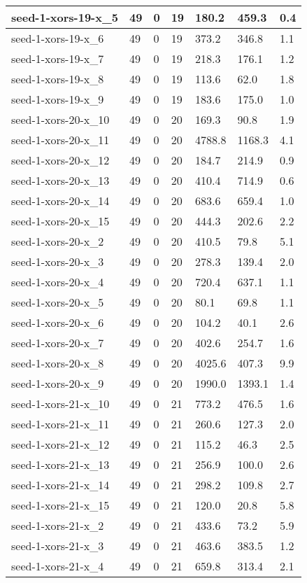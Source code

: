 \begin{scriptsize}
\begin{longtable}{|p{5cm}|l|l|l|l|l|l|}
seed-1-xors-19-x\_5&49&0&19&180.2&459.3&0.4 \\ \hline 
seed-1-xors-19-x\_6&49&0&19&373.2&346.8&1.1 \\ \hline 
seed-1-xors-19-x\_7&49&0&19&218.3&176.1&1.2 \\ \hline 
seed-1-xors-19-x\_8&49&0&19&113.6&62.0&1.8 \\ \hline 
seed-1-xors-19-x\_9&49&0&19&183.6&175.0&1.0 \\ \hline 
seed-1-xors-20-x\_10&49&0&20&169.3&90.8&1.9 \\ \hline 
seed-1-xors-20-x\_11&49&0&20&4788.8&1168.3&4.1 \\ \hline 
seed-1-xors-20-x\_12&49&0&20&184.7&214.9&0.9 \\ \hline 
seed-1-xors-20-x\_13&49&0&20&410.4&714.9&0.6 \\ \hline 
seed-1-xors-20-x\_14&49&0&20&683.6&659.4&1.0 \\ \hline 
seed-1-xors-20-x\_15&49&0&20&444.3&202.6&2.2 \\ \hline 
seed-1-xors-20-x\_2&49&0&20&410.5&79.8&5.1 \\ \hline 
seed-1-xors-20-x\_3&49&0&20&278.3&139.4&2.0 \\ \hline 
seed-1-xors-20-x\_4&49&0&20&720.4&637.1&1.1 \\ \hline 
seed-1-xors-20-x\_5&49&0&20&80.1&69.8&1.1 \\ \hline 
seed-1-xors-20-x\_6&49&0&20&104.2&40.1&2.6 \\ \hline 
seed-1-xors-20-x\_7&49&0&20&402.6&254.7&1.6 \\ \hline 
seed-1-xors-20-x\_8&49&0&20&4025.6&407.3&9.9 \\ \hline 
seed-1-xors-20-x\_9&49&0&20&1990.0&1393.1&1.4 \\ \hline 
seed-1-xors-21-x\_10&49&0&21&773.2&476.5&1.6 \\ \hline 
seed-1-xors-21-x\_11&49&0&21&260.6&127.3&2.0 \\ \hline 
seed-1-xors-21-x\_12&49&0&21&115.2&46.3&2.5 \\ \hline 
seed-1-xors-21-x\_13&49&0&21&256.9&100.0&2.6 \\ \hline 
seed-1-xors-21-x\_14&49&0&21&298.2&109.8&2.7 \\ \hline 
seed-1-xors-21-x\_15&49&0&21&120.0&20.8&5.8 \\ \hline 
seed-1-xors-21-x\_2&49&0&21&433.6&73.2&5.9 \\ \hline 
seed-1-xors-21-x\_3&49&0&21&463.6&383.5&1.2 \\ \hline 
seed-1-xors-21-x\_4&49&0&21&659.8&313.4&2.1 \\ \hline 

\end{longtable}
\end{scriptsize}
